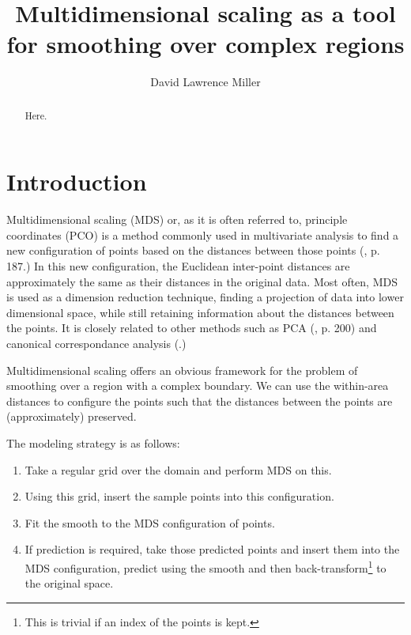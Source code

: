 \documentclass[a4paper,10pt]{amsart}
\title{Multidimensional scaling as a tool for smoothing over complex regions}
\author{David Lawrence Miller}
\begin{document}
 
\begin{abstract}
Here.
\end{abstract}
 
 
\newtheorem{thm}{Theorem}[section]
 
\newtheorem{defn}{Definition}[section]
 
\maketitle


\section{Introduction}

Multidimensional scaling (MDS) or, as it is often referred to, principle coordinates (PCO) is a method commonly used in multivariate analysis to find a new configuration of points based on the distances between those points (\cite{chatfieldcollins}, p. 187.) In this new configuration, the Euclidean inter-point distances are approximately the same as their distances in the original data. Most often, MDS is used as a dimension reduction technique, finding a projection of data into lower dimensional space, while still retaining information about the distances between the points. It is closely related to other methods such as PCA (\cite{chatfieldcollins}, p. 200) and canonical correspondance analysis (\cite{terbraak}.)

Multidimensional scaling offers an obvious framework for the problem of smoothing over a region with a complex boundary. We can use the within-area distances to configure the points such that the distances between the points are (approximately) preserved.

The modeling strategy is as follows:

\begin{enumerate}
\item Take a regular grid over the domain and perform MDS on this.
\item Using this grid, insert the sample points into this configuration.
\item Fit the smooth to the MDS configuration of points.
\item If prediction is required, take those predicted points and insert them into the MDS configuration, predict using the smooth and then back-transform\footnote{This is trivial if an index of the points is kept.} to the original space.
\end{enumerate}
\end{document}
